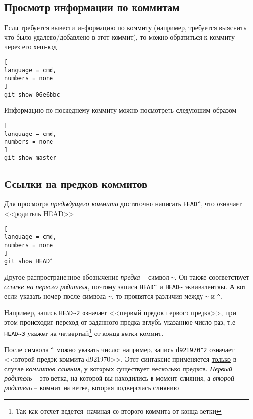 \documentclass[%
	11pt,
	a4paper,
	utf8,
		]{article}
\begin{document}


\subsection{Просмотр информации по коммитам}

Если требуется вывести информацию по коммиту (например, требуется выяснить что было удалено/добавлено в этот коммит), то можно обратиться к коммиту через его хеш-код

\begin{lstlisting}[
language = cmd,
numbers = none
]
git show 06e6bbc
\end{lstlisting}

Информацию по последнему коммиту можно посмотреть следующим образом

\begin{lstlisting}[
language = cmd,
numbers = none
]
git show master
\end{lstlisting}

\subsection{Ссылки на предков коммитов}

Для просмотра \emph{предыдущего коммита} достаточно написать \texttt{HEAD\^}, что означает <<родитель HEAD>>

\begin{lstlisting}[
language = cmd,
numbers = none
]
git show HEAD^
\end{lstlisting}


Другое распространенное обозначение \emph{предка} -- символ \lstinline{~}. Он также соответствует \emph{ссылке на первого родителя}, поэтому записи \lstinline{HEAD^} и \lstinline{HEAD~} эквивалентны. А вот если указать номер после символа \lstinline{~}, то проявятся различия между \lstinline{~} и \lstinline{^}.

Например, запись \lstinline{HEAD~2} означает <<первый предок первого предка>>, при этом происходит переход от заданного предка вглубь указанное число раз, т.е. \lstinline{HEAD~3} укажет на четвертый\footnote{Так как отсчет ведется, начиная со второго коммита от конца ветки} от конца ветки коммит.

После символа \lstinline{^} можно указать число: например, запись \lstinline{d921970^2} означает <<второй предок коммита d921970>>. Этот синтаксис применяется \underline{только} в случае \emph{коммитов слияния}, у которых существует несколько предков. \emph{Первый родитель} -- это ветка, на которой вы находились в момент слияния, а \emph{второй родитель} -- коммит на ветке, которая подверглась слиянию
\end{document}
